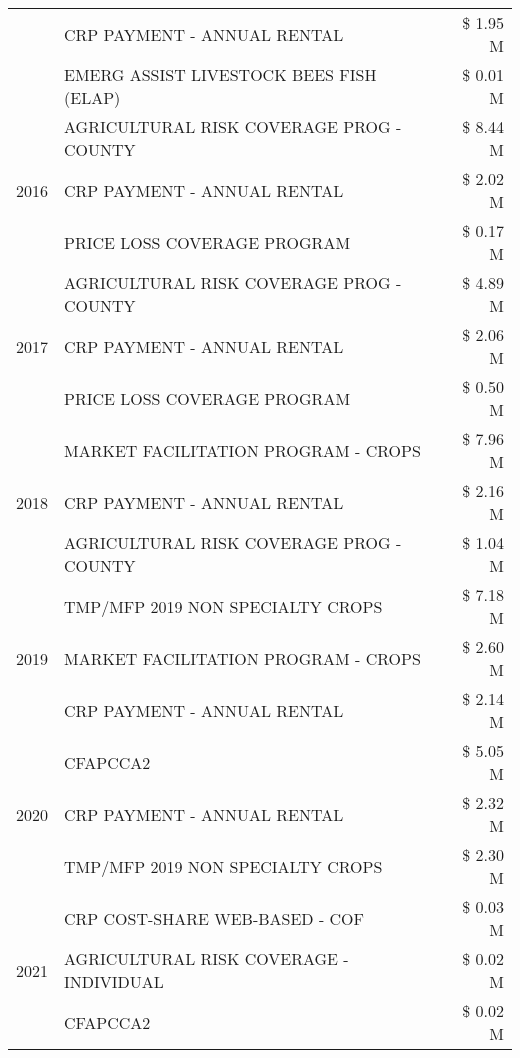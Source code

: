 \begin{tabular}{llr}
 & CRP PAYMENT - ANNUAL RENTAL & \$ 1.95 M \\
 & EMERG ASSIST LIVESTOCK BEES FISH (ELAP) & \$ 0.01 M \\
\cline{1-3}
\multirow[t]{3}{*}{2016} & AGRICULTURAL RISK COVERAGE PROG - COUNTY & \$ 8.44 M \\
 & CRP PAYMENT - ANNUAL RENTAL & \$ 2.02 M \\
 & PRICE LOSS COVERAGE PROGRAM & \$ 0.17 M \\
\cline{1-3}
\multirow[t]{3}{*}{2017} & AGRICULTURAL RISK COVERAGE PROG - COUNTY & \$ 4.89 M \\
 & CRP PAYMENT - ANNUAL RENTAL & \$ 2.06 M \\
 & PRICE LOSS COVERAGE PROGRAM & \$ 0.50 M \\
\cline{1-3}
\multirow[t]{3}{*}{2018} & MARKET FACILITATION PROGRAM - CROPS & \$ 7.96 M \\
 & CRP PAYMENT - ANNUAL RENTAL & \$ 2.16 M \\
 & AGRICULTURAL RISK COVERAGE PROG - COUNTY & \$ 1.04 M \\
\cline{1-3}
\multirow[t]{3}{*}{2019} & TMP/MFP 2019 NON SPECIALTY CROPS & \$ 7.18 M \\
 & MARKET FACILITATION PROGRAM - CROPS & \$ 2.60 M \\
 & CRP PAYMENT - ANNUAL RENTAL & \$ 2.14 M \\
\cline{1-3}
\multirow[t]{3}{*}{2020} & CFAPCCA2 & \$ 5.05 M \\
 & CRP PAYMENT - ANNUAL RENTAL & \$ 2.32 M \\
 & TMP/MFP 2019 NON SPECIALTY CROPS & \$ 2.30 M \\
\cline{1-3}
\multirow[t]{3}{*}{2021} & CRP COST-SHARE WEB-BASED - COF & \$ 0.03 M \\
 & AGRICULTURAL RISK COVERAGE - INDIVIDUAL & \$ 0.02 M \\
 & CFAPCCA2 & \$ 0.02 M \\
\cline{1-3}
\bottomrule
\end{tabular}
